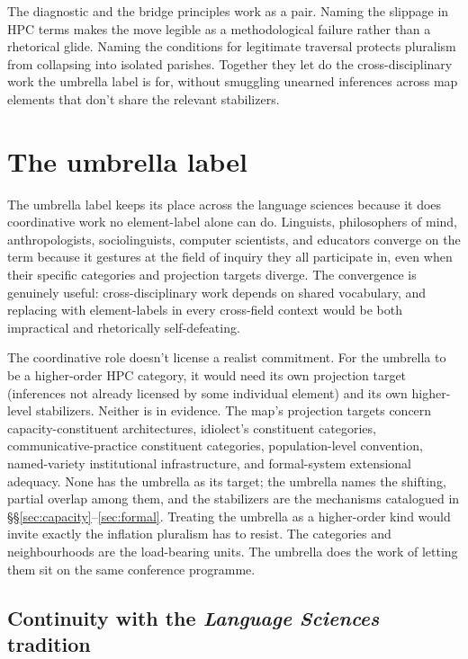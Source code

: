 \documentclass[12pt]{article}
\begin{document}
The diagnostic and the bridge principles work as a pair. Naming the slippage in HPC terms makes the move legible as a methodological failure rather than a rhetorical glide. Naming the conditions for legitimate traversal protects pluralism from collapsing into isolated parishes. Together they let  do the cross-disciplinary work the umbrella label is for, without smuggling unearned inferences across map elements that don't share the relevant stabilizers.

\section{The umbrella label}\label{sec:umbrella}

The umbrella label  keeps its place across the language sciences because it does coordinative work no element-label alone can do. Linguists, philosophers of mind, anthropologists, sociolinguists, computer scientists, and educators converge on the term because it gestures at the field of inquiry they all participate in, even when their specific categories and projection targets diverge. The convergence is genuinely useful: cross-disciplinary work depends on shared vocabulary, and replacing  with element-labels in every cross-field context would be both impractical and rhetorically self-defeating.

The coordinative role doesn't license a realist commitment. For the umbrella to be a higher-order HPC category, it would need its own projection target (inferences not already licensed by some individual element) and its own higher-level stabilizers. Neither is in evidence. The map's projection targets concern capacity-constituent architectures, idiolect's constituent categories, communicative-practice constituent categories, population-level convention, named-variety institutional infrastructure, and formal-system extensional adequacy. None has the umbrella as its target; the umbrella names the shifting, partial overlap among them, and the stabilizers are the mechanisms catalogued in §§\ref{sec:capacity}--\ref{sec:formal}. Treating the umbrella as a higher-order kind would invite exactly the inflation pluralism has to resist. The categories and neighbourhoods are the load-bearing units. The umbrella does the work of letting them sit on the same conference programme.

\subsection{Continuity with the \textit{Language Sciences} tradition}\label{sec:umbrella-tradition}
\end{document}
